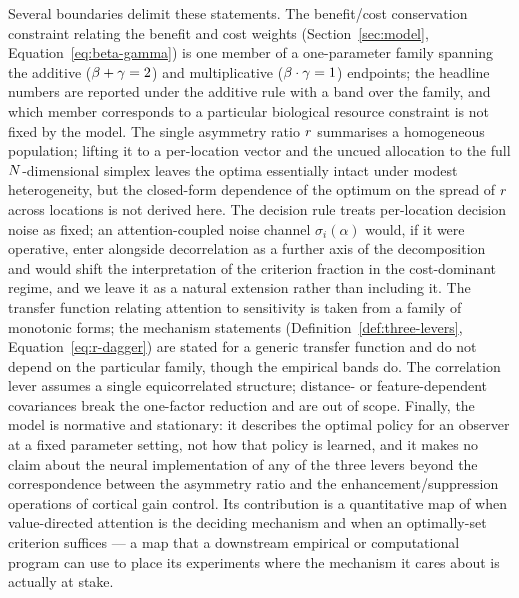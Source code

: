 Several boundaries delimit these statements. The benefit/cost
conservation constraint relating the benefit and cost weights
(Section~\ref{sec:model}, Equation~\eqref{eq:beta-gamma}) is one member
of a one-parameter family spanning the additive
($\beta + \gamma = 2$) and multiplicative ($\beta \cdot \gamma = 1$)
endpoints; the headline numbers are reported under the additive rule
with a band over the family, and which member corresponds to a
particular biological resource constraint is not fixed by the model. The single asymmetry ratio $r$ summarises a
homogeneous population; lifting it to a per-location vector and the uncued
allocation to the full $N$-dimensional simplex leaves the optima
essentially intact under modest heterogeneity, but the closed-form
dependence of the optimum on the spread of $r$ across locations is
not derived here. The decision rule treats per-location decision noise as
fixed; an attention-coupled noise channel $\sigma_i(\alpha)$ would, if it
were operative, enter alongside decorrelation as a further axis of the
decomposition and would shift the interpretation of the criterion
fraction in the cost-dominant regime, and we leave it as a natural
extension rather than including it. The transfer function relating
attention to sensitivity is taken from a family of monotonic forms; the
mechanism statements (Definition~\ref{def:three-levers},
Equation~\eqref{eq:r-dagger}) are stated for a generic transfer function
and do not depend on the particular family, though the empirical bands
do. The correlation lever assumes a single equicorrelated structure;
distance- or feature-dependent covariances break the one-factor
reduction and are out of scope. Finally, the model is normative and
stationary: it describes the optimal policy for an observer at a fixed
parameter setting, not how that policy is learned, and it makes no claim
about the neural implementation of any of the three levers beyond the
correspondence between the asymmetry ratio and the enhancement/suppression
operations of cortical gain control. Its contribution is a quantitative
map of when value-directed attention is the deciding mechanism and when an
optimally-set criterion suffices --- a map that a downstream empirical or
computational program can use to place its experiments where the
mechanism it cares about is actually at stake.
